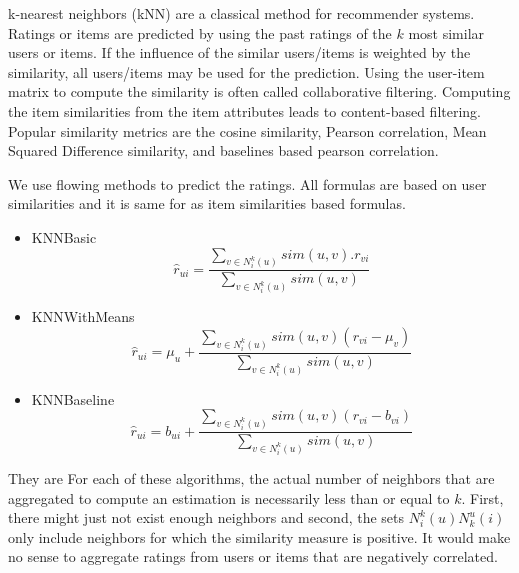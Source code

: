 
k-nearest neighbors (kNN) are a classical method for recommender systems. Ratings or items are predicted by using the past ratings of the $k$ most similar users or items. If the influence of the similar users/items is weighted by the similarity, all users/items may be used for the prediction. Using the user-item matrix to compute the similarity is often called collaborative filtering. Computing the item similarities from the item attributes leads to content-based filtering. Popular similarity metrics are the cosine similarity, Pearson correlation, Mean Squared Difference similarity, and baselines based pearson correlation. 

We use flowing methods to predict the ratings. All formulas are based on user similarities and it is same for as item similarities based formulas.
\begin{itemize}
\item KNNBasic
$$\hat{r}_{ui}=\frac{\sum_{v \in N_i^k(u)} sim(u,v).r_{vi}}{\sum_{v \in N_i^k(u)} sim(u,v)}$$

\item KNNWithMeans
$$\hat{r}_{ui}=\mu_u+\frac{\sum_{v \in N_i^k(u)} sim(u,v)(r_{vi}-\mu_v)}{\sum_{v \in N_i^k(u)} sim(u,v)}$$

\item KNNBaseline
$$\hat{r}_{ui}=b_{ui}+\frac{\sum_{v \in N_i^k(u)} sim(u,v)(r_{vi}-b_{vi})}{\sum_{v \in N_i^k(u)} sim(u,v)}$$
\end{itemize}
They are For each of these algorithms, the actual number of neighbors that are aggregated to compute an estimation is necessarily less than or equal to $k$. First, there might just not exist enough neighbors and second, the sets $N_i^k(u) N_k^u(i)$ only include neighbors for which the similarity measure is positive. It would make no sense to aggregate ratings from users or items that are negatively correlated. 